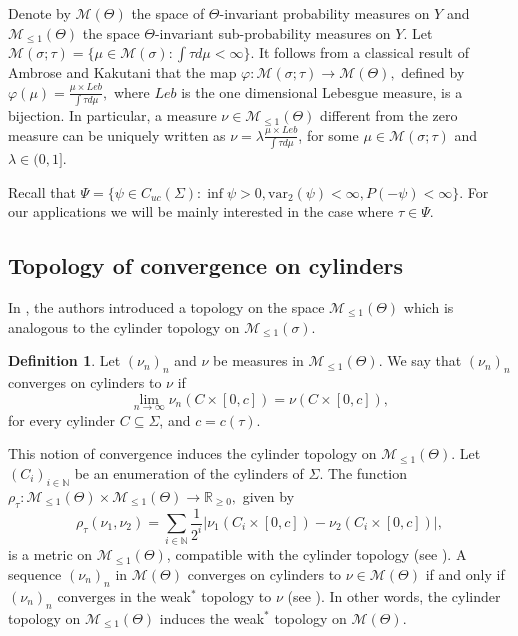 \documentclass[letterpaper,11pt]{amsart}
\theoremstyle{plain}
\theoremstyle{plain}
\theoremstyle{definition}
\newtheorem{definition}{Definition}[subsection]
\theoremstyle{remark}
\def\R{{\mathbb R}}
\def\N{{\mathbb N}}
\def\M{{\mathcal M}}
\begin{document}
Denote by $\M(\Theta)$  the space of $\Theta$-invariant probability measures on $Y$ and $\M_{\le1}(\Theta)$  the space $\Theta$-invariant sub-probability measures on $Y$. Let $\M(\sigma;\tau)=\{\mu\in\M(\sigma): \int\tau d\mu<\infty\}$. It follows from a classical result of Ambrose and Kakutani \cite{ak} that the map $\varphi: \M(\sigma;\tau) \to \M(\Theta),$ defined by $\varphi(\mu)= \frac{\mu \times Leb}{\int \tau d\mu},$ 
where $Leb$ is the one dimensional Lebesgue measure, is a bijection. In particular, a measure $\nu\in \M_{\le 1}(\Theta)$ different from the zero measure can be uniquely  written as $\nu=\lambda  \frac{\mu \times Leb}{\int \tau d\mu}$, for some $\mu\in \M(\sigma;\tau)$ and $\lambda\in (0,1]$. 

Recall that $\Psi=\{\psi\in C_{uc}(\Sigma): \inf \psi>0, \text{var}_2(\psi)<\infty, P(-\psi)<\infty\}.$ For our applications we will be mainly interested in the case where $\tau\in \Psi$. 

\subsection{Topology of convergence on cylinders} In \cite[Section 6]{iv}, the authors introduced a topology on the space $\M_{\le 1}(\Theta)$ which is analogous to the cylinder topology on $\M_{\le1}(\sigma)$. 

\begin{definition} \label{def:top1} Let $(\nu_n)_n$ and $\nu$ be measures in $\M_{\le 1}(\Theta)$.  We say that $(\nu_n)_n$ converges on cylinders to $\nu$ if $$\lim_{n\to\infty}\nu_n(C\times [0,c])=\nu(C\times[0,c]),$$
for every cylinder $C\subseteq \Sigma$, and $c=c(\tau)$. 
\end{definition}

This notion of convergence induces the cylinder topology on $\M_{\le 1}(\Theta)$. Let $(C_i)_{i\in\N}$ be an enumeration of the cylinders of $\Sigma$. The function
$\rho_\tau:\M_{\le1}(\Theta)\times \M_{\le1}(\Theta)\to\R_{\ge 0},$ given by 
$$ \rho_\tau(\nu_1,\nu_2)=\sum_{i\in \N}\frac{1}{2^i}|\nu_1(C_i\times [0,c])-\nu_2(C_i\times [0,c])|,$$
is a metric on $\M_{\le1}(\Theta)$, compatible with the cylinder topology (see \cite[Lemma 6.6]{iv}). A sequence $(\nu_n)_n$ in $\M(\Theta)$ converges on cylinders to $\nu\in \M(\Theta)$ if and only if $(\nu_n)_n$ converges  in the weak$^*$ topology to $\nu$ (see \cite[Lemma 6.7]{iv}). In other words, the cylinder topology on $\M_{\le1}(\Theta)$ induces the weak$^*$ topology on  $\M(\Theta)$.
\end{document}
